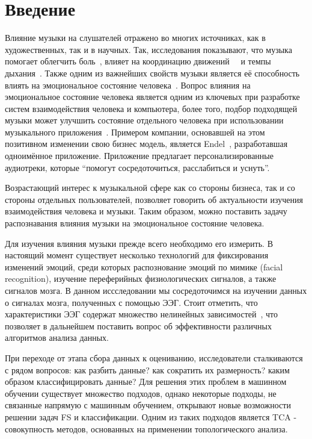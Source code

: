 \documentclass{article}
\begin{document}
\section{Введение}
Влияние музыки на слушателей отражено во многих источниках, как в художественных, так и в научных. Так, исследования показывают, что музыка помогает облегчить боль~\cite{Newbold}, влияет на координацию движений~\cite{Repp}~\cite{Aschersleben} и темпы дыхания~\cite{Siwiak}. Также одним из важнейших свойств музыки является её способность влиять на эмоциональное состояние человека~\cite{Koelsch}. Вопрос влияния на эмоциональное состояние человека является одним из ключевых при разработке систем взаимодействия человека и компьютера, более того, подбор подходящей музыки может улучшить состояние отдельного человека при использовании музыкального приложения~\cite{Leslie}. Примером компании, основавшей на этом позитивном изменении свою бизнес модель, является Endel~\cite{Endel}, разработавшая одноимённое приложение. Приложение предлагает персонализированные аудиотреки, которые ``помогут сосредоточиться, расслабиться и уснуть''.

Возрастающий интерес к музыкальной сфере как со стороны бизнеса, так и со стороны отдельных пользователей, позволяет говорить об актуальности изучения взаимодействия человека и музыки. Таким образом, можно поставить задачу распознавания влияния музыки на эмоциональное состояние человека. 

Для изучения влияния музыки прежде всего необходимо его измерить. В настоящий момент существует несколько технологий для фиксирования изменений эмоций, среди которых распознование эмоций по мимике (facial recognition), изучение переферийных физиологических сигналов, а также сигналов мозга. В данном иссследовании мы сосредоточимся на изучении данных о сигналах мозга, полученных с помощью ЭЭГ. Стоит отметить, что характеристики ЭЭГ содержат множество нелинейных зависимостей~\cite{Wang}, что позволяет в дальнейшем поставить вопрос об эффективности различных алгоритмов анализа данных. 

При переходе от этапа сбора данных к оцениванию, исследователи сталкиваются с рядом вопросов: как разбить данные? как сократить их размерность? каким образом классифицировать данные? Для решения этих проблем в машинном обучении существует множество подходов, однако некоторые подходы, не связанные напрямую с машинным обучением, открывают новые возможности решении задач FS и классификации. Одним из таких подходов является TCA - совокупность методов, основанных на применении топологического анализа. 
\end{document}
